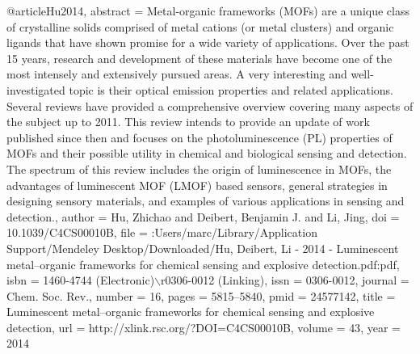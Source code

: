 @article{Hu2014,
abstract = {Metal-organic frameworks (MOFs) are a unique class of crystalline solids comprised of metal cations (or metal clusters) and organic ligands that have shown promise for a wide variety of applications. Over the past 15 years, research and development of these materials have become one of the most intensely and extensively pursued areas. A very interesting and well-investigated topic is their optical emission properties and related applications. Several reviews have provided a comprehensive overview covering many aspects of the subject up to 2011. This review intends to provide an update of work published since then and focuses on the photoluminescence (PL) properties of MOFs and their possible utility in chemical and biological sensing and detection. The spectrum of this review includes the origin of luminescence in MOFs, the advantages of luminescent MOF (LMOF) based sensors, general strategies in designing sensory materials, and examples of various applications in sensing and detection.},
author = {Hu, Zhichao and Deibert, Benjamin J. and Li, Jing},
doi = {10.1039/C4CS00010B},
file = {:Users/marc/Library/Application Support/Mendeley Desktop/Downloaded/Hu, Deibert, Li - 2014 - Luminescent metal–organic frameworks for chemical sensing and explosive detection.pdf:pdf},
isbn = {1460-4744 (Electronic)$\backslash$r0306-0012 (Linking)},
issn = {0306-0012},
journal = {Chem. Soc. Rev.},
number = {16},
pages = {5815--5840},
pmid = {24577142},
title = {{Luminescent metal–organic frameworks for chemical sensing and explosive detection}},
url = {http://xlink.rsc.org/?DOI=C4CS00010B},
volume = {43},
year = {2014}
}
